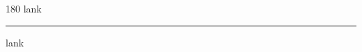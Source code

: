 
\begin{frame}
\begin{center}
\begin{turn}{180}
{\fontsize{2.5cm}{1em}\selectfont lank}
\end{turn}
\vspace{1em}\par  
\hrule
\vspace{1em}\par  
{\fontsize{2.5cm}{1em}\selectfont lank}
\end{center}
\end{frame}
